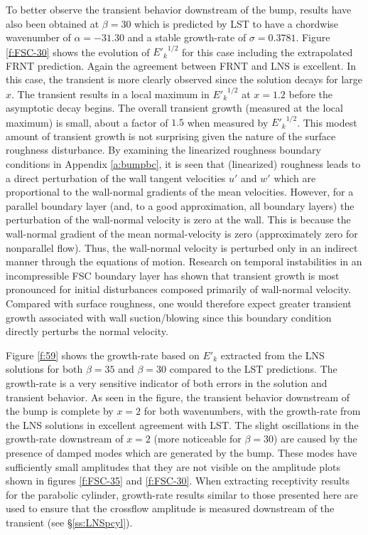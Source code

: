 %
%
%

To better observe the transient behavior downstream of the bump, results have
also been obtained at $\beta = 30$ which is predicted by LST to have a
chordwise wavenumber of $\alpha = -31.30$ and a stable growth-rate of $\sigma
= 0.3781$.  Figure \ref{f:FSC-30} shows the evolution of ${E'_k}^{1/2}$ for
this case including the extrapolated FRNT prediction.  Again the agreement
between FRNT and LNS is excellent.  In this case, the transient is more
clearly observed since the solution decays for large $x$.  The transient
results in a local maximum in ${E'_k}^{1/2}$ at $x=1.2$ before the asymptotic
decay begins.  The overall transient growth (measured at the local maximum) is
small, about a factor of $1.5$ when measured by ${E'_k}^{1/2}$.  This modest
amount of transient growth is not surprising given the nature of the surface
roughness disturbance.  By examining the linearized roughness boundary
conditions in Appendix \ref{a:bumpbc}, it is seen that (linearized) roughness
leads to a direct perturbation of the wall tangent velocities $u'$ and $w'$
which are proportional to the wall-normal gradients of the mean velocities.
However, for a parallel boundary layer (and, to a good approximation, all
boundary layers) the perturbation of the wall-normal velocity is zero at the
wall.  This is because the wall-normal gradient of the mean normal-velocity is
zero (approximately zero for nonparallel flow).  Thus, the wall-normal
velocity is perturbed only in an indirect manner through the equations of
motion.  Research on temporal instabilities in an incompressible FSC boundary
layer \cite{BrKu:93} has shown that transient growth is most pronounced for
initial disturbances composed primarily of wall-normal velocity.  Compared
with surface roughness, one would therefore expect greater transient growth
associated with wall suction/blowing since this boundary condition directly
perturbs the normal velocity.

Figure \ref{f:59} shows the growth-rate based on $E'_k$ extracted from the LNS
solutions for both $\beta=35$ and $\beta=30$ compared to the LST predictions.
The growth-rate is a very sensitive indicator of both errors in the solution
and transient behavior.  As seen in the figure, the transient behavior
downstream of the bump is complete by $x=2$ for both wavenumbers, with the
growth-rate from the LNS solutions in excellent agreement with LST.  The
slight oscillations in the growth-rate downstream of $x=2$ (more noticeable
for $\beta=30$) are caused by the presence of damped modes which are generated
by the bump.  These modes have sufficiently small amplitudes that they are not
visible on the amplitude plots shown in figures \ref{f:FSC-35} and
\ref{f:FSC-30}.  When extracting receptivity results for the parabolic
cylinder, growth-rate results similar to those presented here are used to
ensure that the crossflow amplitude is measured downstream of the transient
(see \S\ref{ss:LNSpcyl}).

